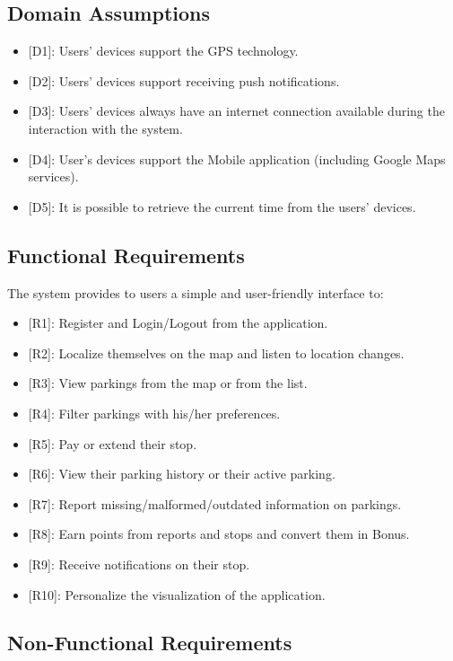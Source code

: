 \documentclass[11pt]{article} %
\begin{document}
\subsection{Domain Assumptions}
\begin{itemize}
  \item {}[D1]: Users' devices support the GPS technology.
  \item {}[D2]: Users' devices support receiving push notifications.
  \item {}[D3]: Users' devices always have an internet connection available during the interaction with the system.
  \item {}[D4]: User's devices support the Mobile application (including Google Maps services).
  \item {}[D5]: It is possible to retrieve the current time from the users' devices.
\end{itemize}

\subsection{Functional Requirements}
The system provides to users a simple and user-friendly interface to:
\begin{itemize}
  \item {}[R1]: Register and Login/Logout from the application.
  \item {}[R2]: Localize themselves on the map and listen to location changes.
  \item {}[R3]: View parkings from the map or from the list.
  \item {}[R4]: Filter parkings with his/her preferences.
  \item {}[R5]: Pay or extend their stop.
  \item {}[R6]: View their parking history or their active parking.
  \item {}[R7]: Report missing/malformed/outdated information on parkings.
  \item {}[R8]: Earn points from reports and stops and convert them in Bonus.
  \item {}[R9]: Receive notifications on their stop.
  \item {}[R10]: Personalize the visualization of the application.  
\end{itemize}



\subsection{Non-Functional Requirements}
\end{document}
